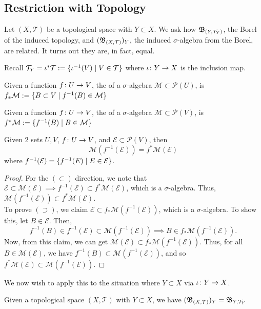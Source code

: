 \documentclass[11pt,leqno,oneside]{amsbook}
\numberwithin{thm}{section}
\renewcommand{\P}{\mathcal{P}} %
\newcommand{\M}{\mathcal{M}} %
\newcommand{\Ep}{\mathcal{E}} %
\newcommand{\Top}{\mathcal{T}} %
\begin{document}
\subsection{Restriction with Topology}
Let \((X,\Top)\) be a topological space with \(Y \subset X\). We ask
how \(\B_{(Y,\Top_Y)}\), the Borel of the induced topology, and
\((\B_{(X,\Top)})_Y\), the induced \(\sigma\)-algebra from the Borel,
are related. It turns out they are, in fact, equal.
\begin{defn}
  Recall \(\Top_Y = \iota^* \Top := \{\iota^{-1}(V) \st V \in \Top\}\)
  where \(\iota \colon Y \to X\) is the inclusion map.
\end{defn}
\begin{defn}
  Given a function \(f \colon U \to V\), the 
    of a \(\sigma\)-algebra \(\M \subset \P(U)\), is \(f_* \M := \{B
  \subset V \st f^{-1}(B) \in \M\}\)
\end{defn}
\begin{defn}
  Given a function \(f \colon U \to V\), the 
    of a \(\sigma\)-algebra \(\M \subset \P(V)\), is \(f^* \M :=
    \{f^{-1}(B) \st B \in \M\}\)
\end{defn}
\begin{prop}
  Given 2 sets \(U,V\), \(f \colon U \to V\), and \(\Ep \subset
  \P(V)\), then \[
    \M(f^{-1}(\Ep)) = f^* \M(\Ep)
  \]
  where \(f^{-1}(\Ep) = \{f^{-1}(E) \st E \in \Ep\}\).
\end{prop}
\begin{proof}
  For the \((\subset)\) direction, we note that \(\Ep \subset \M(\Ep)
  \implies f^{-1}(\Ep) \subset f^* \M(\Ep)\), which is a
  \(\sigma\)-algebra. Thus, \(\M(f^{-1}(\Ep)) \subset f^*
  \M(\Ep)\). \\

  To prove \((\supset)\), we claim \(\Ep \subset f_*
  \M(f^{-1}(\Ep))\), which is a \(\sigma\)-algebra. To show this, let
  \(B \in \Ep\). Then, \[f^{-1}(B) \in f^{-1}(\Ep) \subset
    \M(f^{-1}(\Ep)) \implies B \in f_* \M(f^{-1}(\Ep)).\]
  Now, from this claim, we can get \(\M(\Ep) \subset f_*
  \M(f^{-1}(\Ep))\). Thus, for all \(B \in \M(\Ep)\), we have
  \(f^{-1}(B) \subset \M(f^{-1}(\Ep))\), and so \(f^*\M(\Ep) \subset \M(f^{-1}(\Ep))\).
\end{proof}
We now wish to apply this to the situation where \(Y \subset X\) via
\(\iota \colon Y \to X\).
\begin{cor}
  Given a topological space \((X,\Top)\) with \(Y \subset X\), we have
  \((\B_{(X,\Top)})_Y = \B_{Y,\Top_Y}\)
\end{cor}
\end{document}
